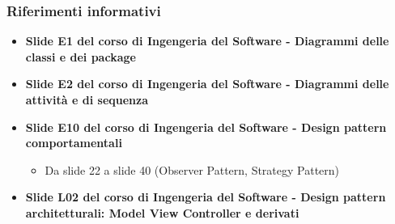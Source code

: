 \subsubsection{Riferimenti informativi}
\begin{itemize}
	\item \textbf{Slide E1 del corso di Ingengeria del Software - Diagrammi delle classi e dei package}
	\item \textbf{Slide E2 del corso di Ingengeria del Software - Diagrammi delle attività e di sequenza}
	\item \textbf{Slide E10 del corso di Ingengeria del Software - Design pattern comportamentali}
		\begin{itemize}
			\item Da slide 22 a slide 40 (Observer Pattern, Strategy Pattern)
		\end{itemize}
	\item \textbf{Slide L02 del corso di Ingengeria del Software - Design pattern architetturali: Model View Controller e derivati}
\end{itemize}
